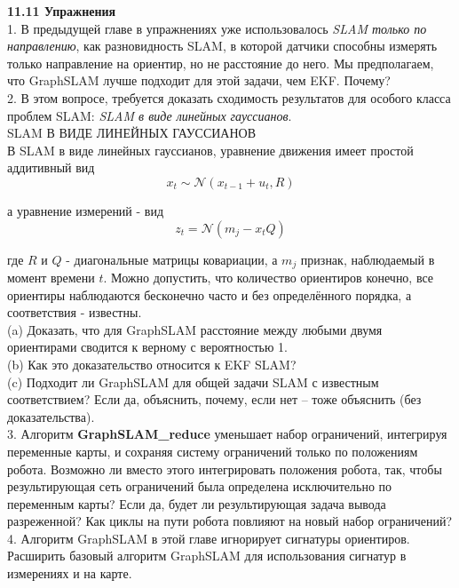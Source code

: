 \documentclass[10pt,a4paper]{article}
\begin{document}
\textbf{11.11	Упражнения}\\

1.	В предыдущей главе в упражнениях уже использовалось \textit{SLAM только по направлению}, как разновидность SLAM, в которой датчики способны измерять только направление на ориентир, но не расстояние до него. Мы предполагаем, что GraphSLAM лучше подходит для этой задачи, чем EKF. Почему?\\

2.	В этом вопросе, требуется доказать сходимость результатов для особого класса проблем SLAM: \textit{SLAM в виде линейных гауссианов}.\\
SLAM В ВИДЕ ЛИНЕЙНЫХ ГАУССИАНОВ\\
В SLAM в виде линейных гауссианов, уравнение движения имеет простой аддитивный вид\\

$$x_t\sim\mathcal{N}(x_{t-1}+u_t,R)$$

а уравнение измерений - вид\\

$$z_t=\mathcal{N}(m_j-x_t Q)$$

где $R$ и $Q$ - диагональные матрицы ковариации, а $m_j$ признак, наблюдаемый в момент времени $t$. Можно допустить, что количество ориентиров конечно, все ориентиры наблюдаются бесконечно часто и без определённого порядка, а соответствия - известны.\\

(a)	Доказать, что для GraphSLAM расстояние между любыми двумя ориентирами сводится к верному с вероятностью 1.\\

(b)	Как это доказательство относится к EKF SLAM?\\

(c)	Подходит ли GraphSLAM для общей задачи SLAM с известным соответствием? Если да, объяснить, почему, если нет – тоже объяснить (без доказательства).\\

3.	Алгоритм \textbf{GraphSLAM\_reduce} уменьшает набор ограничений, интегрируя переменные карты, и сохраняя систему ограничений только по положениям робота. Возможно ли вместо этого интегрировать положения робота, так, чтобы результирующая сеть ограничений была определена исключительно по переменным карты? Если да, будет ли результирующая задача вывода разреженной? Как циклы на пути робота повлияют на новый набор ограничений?\\

4.	Алгоритм GraphSLAM в этой главе игнорирует сигнатуры ориентиров. Расширить базовый алгоритм GraphSLAM для использования сигнатур в измерениях и на карте.\\










 
\end{document}
